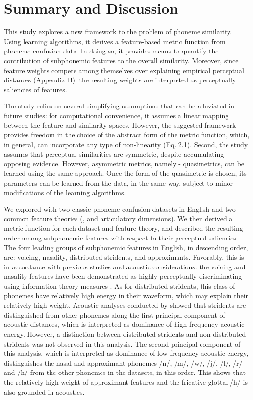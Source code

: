 \section{Summary and Discussion}
This study explores a new framework to the problem of phoneme similarity. Using learning algorithms, it derives a feature-based metric function from phoneme-confusion data. In doing so, it provides means to quantify the contribution of subphonemic features to the overall similarity. Moreover, since feature weights compete among themselves over explaining empirical perceptual distances (Appendix B), the resulting weights are interpreted as perceptually saliencies of features.

The study relies on several simplifying assumptions that can be alleviated in future studies: for computational convenience, it assumes a linear mapping between the feature and similarity spaces. However, the suggested framework provides freedom in the choice of the abstract form of the metric function, which, in general, can incorporate any type of non-linearity (Eq. 2.1). Second, the study assumes that perceptual similarities are symmetric, despite accumulating opposing evidence. However, asymmetric metrics, namely - quasimetrics, can be learned using the same approach. Once the form of the quasimetric is chosen, its parameters can be learned from the data, in the same way, subject to minor modifications of the learning algorithms. 

We explored with two classic phoneme-confusion datasets in English \citep{NicelyMiller1955, Luce1987} and two common feature theories (\citealp{ChomskyHalle1968}, and articulatory dimensions). We then derived a metric function for each dataset and feature theory, and described the resulting order among subphonemic features with respect to their perceptual saliencies. The four leading groups of subphonemic features in English, in descending order, are: voicing, nasality, distributed-stridents, and approximants. Favorably, this is in accordance with previous studies and acoustic considerations: the voicing and nasality features have been demonstrated as highly perceptually discriminating using information-theory measures \citep{NicelyMiller1955}. As for distributed-stridents, this class of phonemes have relatively high energy in their waveform, which may explain their relatively high weight. Acoustic analyses conducted by \citep[see][Figure 15]{Mielke2012} showed that stridents are distinguished from other phonemes along the first principal component of acoustic distances, which is interpreted as dominance of high-frequency acoustic energy. However, a distinction between distributed stridents and non-distributed stridents was not observed in this analysis. The second principal component of this analysis, which is interpreted as dominance of low-frequency acoustic energy, distinguishes the nasal and approximant phonemes /n/, /m/, /w/, /j/, /l/, /r/ and /h/ from the other phonemes in the datasets, in this order. This shows that the relatively high weight of approximant features and the fricative glottal /h/ is also grounded in acoustics.

